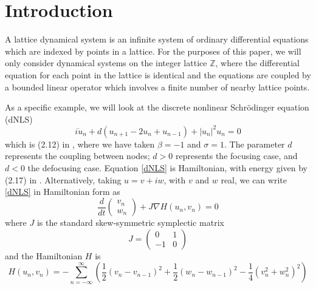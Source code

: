 \documentclass[12pt]{article}
\def\Z{{\mathbb Z}}
\begin{document}
\section{Introduction}

A lattice dynamical system is an infinite system of ordinary differential equations which are indexed by points in a lattice. For the purposes of this paper, we will only consider dynamical systems on the integer lattice $\Z$, where the differential equation for each point in the lattice is identical and the equations are coupled by a bounded linear operator which involves a finite number of nearby lattice points.

As a specific example, we will look at the discrete nonlinear Schr{\"o}dinger equation (dNLS)
\begin{equation}\label{dNLS}
i\dot{u}_n + d(u_{n+1} - 2 u_n + u_{n-1}) + |u_n|^2 u_n = 0
\end{equation}
which is (2.12) in \cite{Kevrekidis2009}, where we have taken $\beta = -1$ and $\sigma = 1$. The parameter $d$ represents the coupling between nodes; $d > 0$ represents the focusing case, and $d < 0$ the defocusing case. Equation \eqref{dNLS} is Hamiltonian, with energy given by (2.17) in \cite{Kevrekidis2009}. Alternatively, taking $u = v + i w$, with $v$ and $w$ real, we can write \eqref{dNLS} in Hamiltonian form as
\begin{equation}\label{dNLSrealHam}
\frac{d}{dt}\begin{pmatrix}v_n \\ w_n\end{pmatrix}
+ J \nabla H(u_n, v_n) = 0
\end{equation}
where $J$ is the standard skew-symmetric symplectic matrix
\[
J = \begin{pmatrix}0 & 1 \\ -1 & 0\end{pmatrix}
\]
and the Hamiltonian $H$ is
\begin{equation}\label{dNLSrealH}
H(u_n, v_n) = -\sum_{n = -\infty}^\infty 
\left( \frac{1}{2}\left(v_n - v_{n-1}\right)^2 + \frac{1}{2}\left(w_n - w_{n-1}\right)^2 - \frac{1}{4}\left( v_n^2 + w_n^2 \right)^2 \right)
\end{equation}
\end{document}
